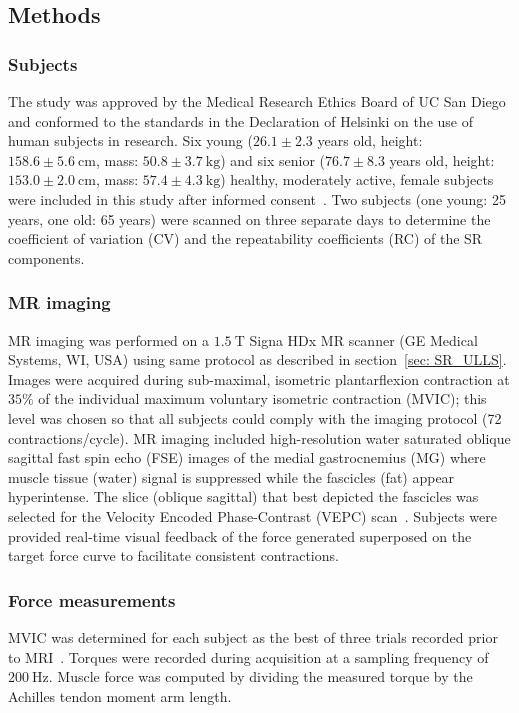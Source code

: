 \subsection{Methods}
\subsubsection{Subjects}
The study was approved by the Medical Research Ethics Board of UC San Diego and conformed to the standards in the Declaration of Helsinki on the use of human subjects in research.
Six young ($26.1 \pm 2.3$ years old, height: $158.6 \pm \SI{5.6}{\centi\meter}$, mass: $50.8 \pm \SI{3.7}{\kilogram}$) and six senior ($76.7 \pm 8.3$ years old, height: $153.0 \pm \SI{2.0}{\centi\meter}$, mass: $57.4 \pm \SI{4.3}{\kilogram}$) healthy, moderately active, female subjects were included in this study after informed consent~\cite{RNS16}. 
Two subjects (one young: 25 years, one old: 65 years) were scanned on three separate days to determine the coefficient of variation (CV) and the repeatability coefficients (RC) of the SR components. 
\subsubsection{MR imaging}
MR imaging was performed on a $\SI{1.5}{\tesla}$ Signa HDx MR scanner (GE Medical Systems, WI, USA) using same protocol as described in section~\ref{sec: SR_ULLS}. 
Images were acquired during sub-maximal, isometric plantarflexion contraction at $35\%$ of the individual maximum voluntary isometric contraction (MVIC); this level was chosen so that all subjects could comply with the imaging protocol (72 contractions/cycle). 
MR imaging included high-resolution water saturated oblique sagittal fast spin echo (FSE) images of the medial gastrocnemius (MG) where muscle tissue (water) signal is suppressed while the fascicles (fat) appear hyperintense. 
The slice (oblique sagittal) that best depicted the fascicles was selected for the Velocity Encoded Phase-Contrast (VEPC) scan~\cite{RNS16}.
Subjects were provided real-time visual feedback of the force generated superposed on the target force curve to facilitate consistent contractions.
\subsubsection{Force measurements}
MVIC was determined for each subject as the best of three trials recorded prior to MRI~\cite{RNS16, RNSS10}. 
Torques were recorded during acquisition at a sampling frequency of $\SI{200}{\hertz}$.
Muscle force was computed by dividing the measured torque by the Achilles tendon moment arm length.

